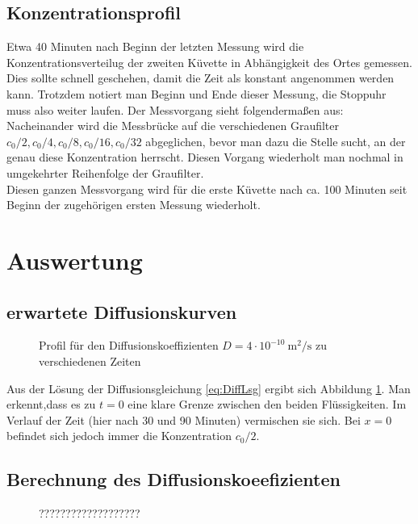 \documentclass[12pt,a4paper,titlepage,headinclude,bibtotoc]{scrartcl}
\begin{document}
\subsection{Konzentrationsprofil}
Etwa 40 Minuten nach Beginn der letzten Messung wird die Konzentrationsverteilug der zweiten Küvette in Abhängigkeit des Ortes gemessen.
Dies sollte schnell geschehen, damit die Zeit als konstant angenommen werden kann.
Trotzdem notiert man Beginn und Ende dieser Messung, die Stoppuhr muss also weiter laufen.
Der Messvorgang sieht folgendermaßen aus:
Nacheinander wird die Messbrücke auf die verschiedenen Graufilter $c_0/2, c_0/4, c_0/8, c_0/16, c_0/32$ abgeglichen, bevor man dazu die Stelle sucht, an der genau diese Konzentration herrscht.
Diesen Vorgang wiederholt man nochmal in umgekehrter Reihenfolge der Graufilter.\\
Diesen ganzen Messvorgang wird für die erste Küvette nach ca. 100 Minuten  seit Beginn der zugehörigen ersten Messung wiederholt. 

\section{Auswertung}
\label{sec:auswertung}

\subsection{erwartete Diffusionskurven}
\begin{figure}
	
	\caption{Profil für den Diffusionskoeffizienten $D=4\cdot 10^{-10} ~ \si{\meter ^2 / \second}$ zu verschiedenen Zeiten}
	\label{fig:erwDiffKurve}
\end{figure}

Aus der Lösung der Diffusionsgleichung \eqref{eq:DiffLsg} ergibt sich Abbildung \ref{fig:erwDiffKurve}.
Man erkennt,dass es zu $t=0$ eine klare Grenze zwischen den beiden Flüssigkeiten.
Im Verlauf der Zeit (hier nach 30 und 90 Minuten) vermischen sie sich.
Bei $x=0$ befindet sich jedoch immer die Konzentration $c_0/2$.

\subsection{Berechnung des Diffusionskoeefizienten}

\begin{figure}
	
	\caption{???????????????????}
\end{figure}
\end{document}
